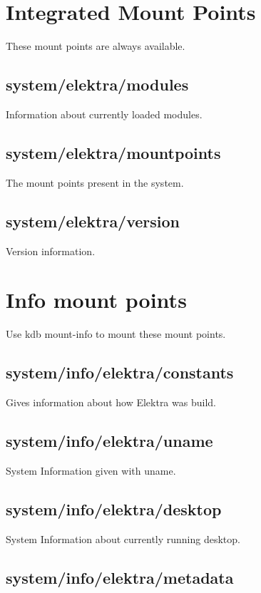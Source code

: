 \section*{Integrated Mount Points}

These mount points are always available.

\subsection*{system/elektra/modules}

Information about currently loaded modules.

\subsection*{system/elektra/mountpoints}

The mount points present in the system.

\subsection*{system/elektra/version}

Version information.

\section*{Info mount points}

Use {\ttfamily kdb mount-\/info} to mount these mount points.

\subsection*{system/info/elektra/constants}

Gives information about how Elektra was build.

\subsection*{system/info/elektra/uname}

System Information given with {\ttfamily uname}.

\subsection*{system/info/elektra/desktop}

System Information about currently running desktop.

\subsection*{system/info/elektra/metadata}

